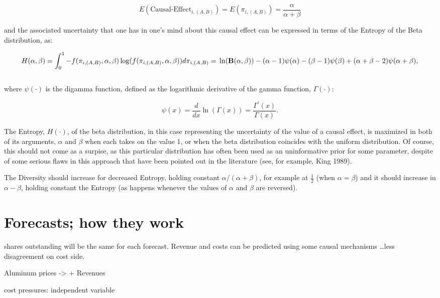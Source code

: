 \documentclass[11pt]{article}
\begin{document}
$$E(\text{Causal-Effect}_{i, (A, B)}) = E(\pi_{i, (A, B)})=\frac{\alpha}{\alpha + \beta}$$

and the associated uncertainty that one has in one's mind about this causal effect can be expressed in terms of the Entropy of the Beta distribution, as:

\begin{equation} \label{eq: entropy}
H(\alpha, \beta)=\int_0^1 -f(\pi_{i, (A, B)}, \alpha, \beta)\log(f(\pi_{i, (A, B)}, \alpha, \beta))d\pi_{i, (A, B)}=\\

\ln(\textbf{B}(\alpha, \beta))-(\alpha-1)\psi(\alpha)-(\beta-1)\psi(\beta)+(\alpha+\beta-2)\psi(\alpha+\beta),
\end{equation}\\


where $\psi(\cdot)$ is the digamma function, defined as the logarithmic derivative of the gamma function, $\Gamma(\cdot)$:

\begin{equation}
\psi(x)=\frac{d}{dx}\ln(\Gamma(x))=\frac{\Gamma^{'}(x)}{\Gamma(x)}.
\end{equation}

The Entropy, $H(\cdot)$, of the beta distribution, in this case representing the uncertainty of the value of a causal effect, is maximized in both of its arguments, $\alpha$ and $\beta$ when each takes on the value $1$, or when the beta distribution coincides with the uniform distribution. Of course, this should not come as a surpise, as this particular distribution has often been used as an uninformative prior for some parameter, despite of some serious flaws in this approach that have been pointed out in the literature (see, for example, King 1989).

The Diversity should increase for decreased Entropy, holding constant $\alpha/(\alpha + \beta)$, for example at $\frac{1}{2}$ (when $\alpha =\beta$) and it should increase in $\alpha-\beta$, holding constant the Entropy (as happens whenever the values of $\alpha$ and $\beta$ are reversed).
\section{Forecasts; how they work}
\label{sec-5}

shares outstanding will be the same for each forecast. Revenue and costs can be predicted using some causal mechanisms \ldots{}less disagreement on cost side.

Aluminum prices -> + Revenues

cost pressures: independent variable
\end{document}
